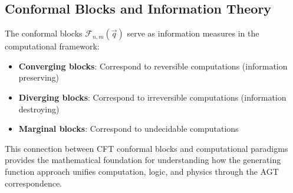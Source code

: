 \subsection{Conformal Blocks and Information Theory}

\begin{theorem}
\label{thm:blocks-information}
The conformal blocks $\mathcal{F}_{n,m}(\vec{q})$ serve as information measures in the computational framework:
\begin{itemize}
\item \textbf{Converging blocks}: Correspond to reversible computations (information preserving)
\item \textbf{Diverging blocks}: Correspond to irreversible computations (information destroying)
\item \textbf{Marginal blocks}: Correspond to undecidable computations
\end{itemize}
\end{theorem}

This connection between CFT conformal blocks and computational paradigms provides the mathematical foundation for understanding how the generating function approach unifies computation, logic, and physics through the AGT correspondence.
